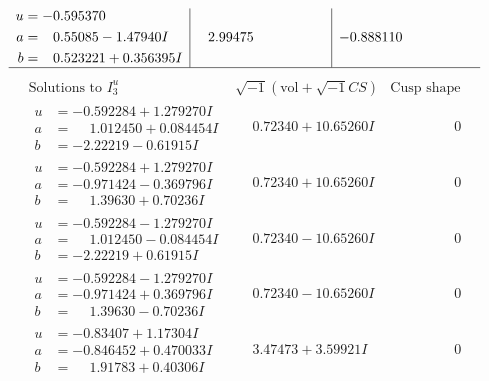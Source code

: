 \documentclass[1p]{elsarticle_modified}
\theoremstyle{definition}
\newcommand{\I}{\sqrt{-1}}
\begin{document}
$$\begin{array}{c|c|c}
\begin{aligned}
u &= -0.595370\phantom{ +0.000000I} \\
a &= \phantom{-}0.55085 - 1.47940 I \\
b &= \phantom{-}0.523221 + 0.356395 I\end{aligned}
 & \phantom{-}2.99475\phantom{ +0.000000I} & -0.888110\phantom{ +0.000000I}\\
 \hline 
 \end{array}$$\newpage$$\begin{array}{c|c|c}  
\text{Solutions to }I^u_{3}& \I (\text{vol} + \sqrt{-1}CS) & \text{Cusp shape}\\
 \hline 
\begin{aligned}
u &= -0.592284 + 1.279270 I \\
a &= \phantom{-}1.012450 + 0.084454 I \\
b &= -2.22219 - 0.61915 I\end{aligned}
 & \phantom{-}0.72340 + 10.65260 I & \phantom{-0.000000 } 0 \\ \hline\begin{aligned}
u &= -0.592284 + 1.279270 I \\
a &= -0.971424 - 0.369796 I \\
b &= \phantom{-}1.39630 + 0.70236 I\end{aligned}
 & \phantom{-}0.72340 + 10.65260 I & \phantom{-0.000000 } 0 \\ \hline\begin{aligned}
u &= -0.592284 - 1.279270 I \\
a &= \phantom{-}1.012450 - 0.084454 I \\
b &= -2.22219 + 0.61915 I\end{aligned}
 & \phantom{-}0.72340 - 10.65260 I & \phantom{-0.000000 } 0 \\ \hline\begin{aligned}
u &= -0.592284 - 1.279270 I \\
a &= -0.971424 + 0.369796 I \\
b &= \phantom{-}1.39630 - 0.70236 I\end{aligned}
 & \phantom{-}0.72340 - 10.65260 I & \phantom{-0.000000 } 0 \\ \hline\begin{aligned}
u &= -0.83407 + 1.17304 I \\
a &= -0.846452 + 0.470033 I \\
b &= \phantom{-}1.91783 + 0.40306 I\end{aligned}
 & \phantom{-}3.47473 + 3.59921 I & \phantom{-0.000000 } 0 \\ \hline\begin{aligned}

\end{aligned}
\end{array}$$
\end{document}
